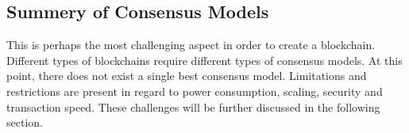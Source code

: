 \subsection{Summery of Consensus Models}
\begin{table}[htb] 
  
  \centering
  \label{tab:consensus}  
  \begin{center}
\end{center}
\end{table}


This is perhaps the most challenging aspect in order to create a blockchain. Different types of blockchains require different types of consensus models.  
At this point, there does not exist a single best consensus model. Limitations and restrictions are present in regard to power consumption, scaling, security and transaction speed. These challenges will be further discussed in the following section. 


